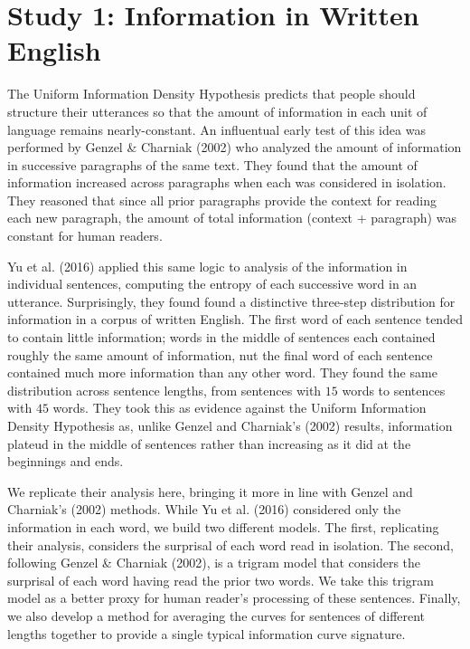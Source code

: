 \documentclass[10pt, letterpaper]{article}
\begin{document}
\hypertarget{study-1-information-in-written-english}{%
\section{Study 1: Information in Written
English}\label{study-1-information-in-written-english}}

The Uniform Information Density Hypothesis predicts that people should
structure their utterances so that the amount of information in each
unit of language remains nearly-constant. An influentual early test of
this idea was performed by Genzel \& Charniak (2002) who analyzed the
amount of information in successive paragraphs of the same text. They
found that the amount of information increased across paragraphs when
each was considered in isolation. They reasoned that since all prior
paragraphs provide the context for reading each new paragraph, the
amount of total information (context + paragraph) was constant for human
readers.

Yu et al. (2016) applied this same logic to analysis of the information
in individual sentences, computing the entropy of each successive word
in an utterance. Surprisingly, they found found a distinctive three-step
distribution for information in a corpus of written English. The first
word of each sentence tended to contain little information; words in the
middle of sentences each contained roughly the same amount of
information, nut the final word of each sentence contained much more
information than any other word. They found the same distribution across
sentence lengths, from sentences with \(15\) words to sentences with
\(45\) words. They took this as evidence against the Uniform Information
Density Hypothesis as, unlike Genzel and Charniak's (2002) results,
information plateud in the middle of sentences rather than increasing as
it did at the beginnings and ends.

We replicate their analysis here, bringing it more in line with Genzel
and Charniak's (2002) methods. While Yu et al. (2016) considered only
the information in each word, we build two different models. The first,
replicating their analysis, considers the surprisal of each word read in
isolation. The second, following Genzel \& Charniak (2002), is a trigram
model that considers the surprisal of each word having read the prior
two words. We take this trigram model as a better proxy for human
reader's processing of these sentences. Finally, we also develop a
method for averaging the curves for sentences of different lengths
together to provide a single typical information curve signature.
\end{document}
